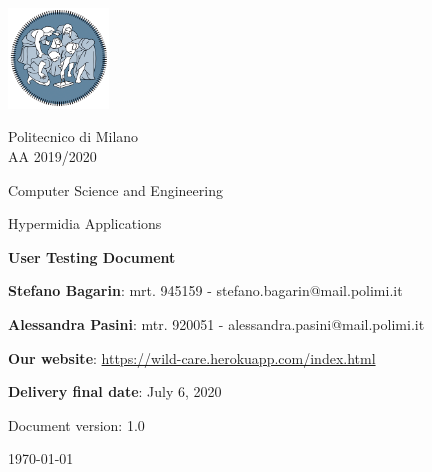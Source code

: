 \documentclass[11pt, a4paperm, hidelinks]{article}
\begin{document}
	\begin{titlepage}
		\centering
		\includegraphics[width=0.20\textwidth]{./assets/polimi-logo.png}\par

		{Politecnico di Milano \\ AA 2019/2020} \par
		\vspace{1.5cm}

		{Computer Science and Engineering}\par
		\Large{Hypermidia Applications}\par
		\vspace{1.0cm}

		{\LARGE \textbf{User Testing Document} \par}
		\vspace{1.5cm}

		{\normalsize {\textbf{Stefano Bagarin}: mrt. 945159 -  stefano.bagarin@mail.polimi.it }\par}
		\vspace{0.2cm}
		{\normalsize{\textbf{Alessandra Pasini}: mtr. 920051 - alessandra.pasini@mail.polimi.it}\par}
		\vspace{1.0cm}
		
		{\normalsize {\textbf{Our website}: \url{https://wild-care.herokuapp.com/index.html}}\par}
		\vspace{0.2cm}
		{\normalsize {\textbf{Delivery final date}: July 6, 2020}\par}
		\vfill

		{\large Document version: 1.0\par}
		{\large \today \par}
	\end{titlepage}

	\tableofcontents
	\clearpage


\end{document}

